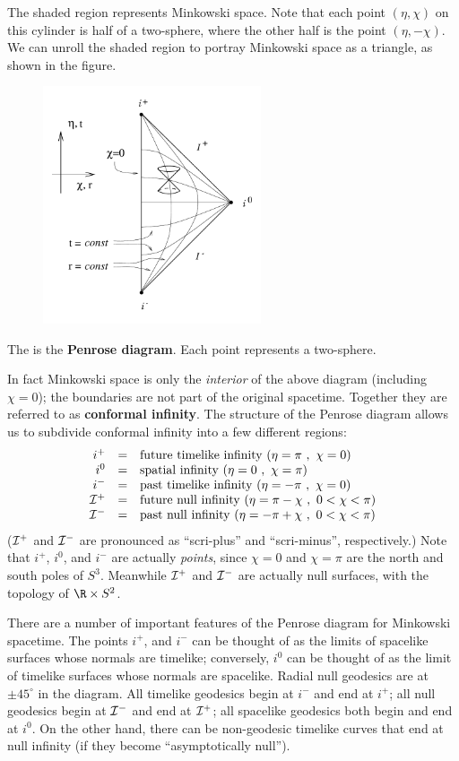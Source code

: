 \documentclass[12pt]{article}
\begin{document}
\noindent The shaded region represents Minkowski space.  Note that 
each point $(\eta,\chi)$ on this cylinder is half of a two-sphere, where 
the other half is the point $(\eta,-\chi)$.  We can unroll the 
shaded region to portray Minkowski space as a triangle, as shown
in the figure.
\begin{figure}[ht]
  \centerline{
  \includegraphics[height=7cm]{pdf/seven23}}
\end{figure}
The is the {\bf Penrose diagram}.  Each point represents a 
two-sphere.

In fact Minkowski space is only the {\it interior} of the above
diagram (including $\chi=0$); the boundaries are not part of the
original spacetime.  Together they are referred to as {\bf conformal
infinity}.  The structure of the Penrose diagram allows us to subdivide 
conformal infinity into
a few different regions:
\[
  \begin{array}{rcl}
  i^+ &=&  {\rm future~timelike~infinity~} (\eta=\pi\ ,\ \chi=0)\cr
  i^0 &=&  {\rm spatial~infinity~} (\eta=0\ ,\ \chi=\pi)\cr
  i^- &=&  {\rm past~timelike~infinity~} (\eta=-\pi\ ,\ \chi=0)\cr
  {\cal I}^+ &=& {\rm future~null~infinity~} (\eta=\pi-\chi\ ,\ 0<\chi<\pi)\cr
  {\cal I}^- &=& {\rm past~null~infinity~} (\eta=-\pi+\chi\ ,\ 0<\chi<\pi)
  \end{array}
\]
(${\cal I}^+$ and ${\cal I}^-$ are pronounced as ``scri-plus'' and
``scri-minus'', respectively.)  Note that $i^+$, $i^0$, and $i^-$ are
actually {\it points}, since $\chi=0$ and $\chi=\pi$ are the north and
south poles of $S^3$.  Meanwhile ${\cal I}^+$ and ${\cal I}^-$ are
actually null surfaces, with the topology of $\R\times S^2$.

There are a number of important features of the Penrose diagram for
Minkowski spacetime.  The points $i^+$, and $i^-$ can be thought of
as the limits of spacelike surfaces whose normals are timelike;
conversely, $i^0$ can be thought of as the limit of timelike surfaces
whose normals are spacelike.  Radial null geodesics are at 
$\pm 45^\circ$ in the diagram.
All timelike geodesics begin at $i^-$
and end at $i^+$; all null geodesics begin at ${\cal I}^-$ and end
at ${\cal I}^+$; all spacelike geodesics both begin and end at $i^0$.
On the other hand, there can be non-geodesic timelike curves that 
end at null infinity (if they become ``asymptotically null'').
\end{document}
